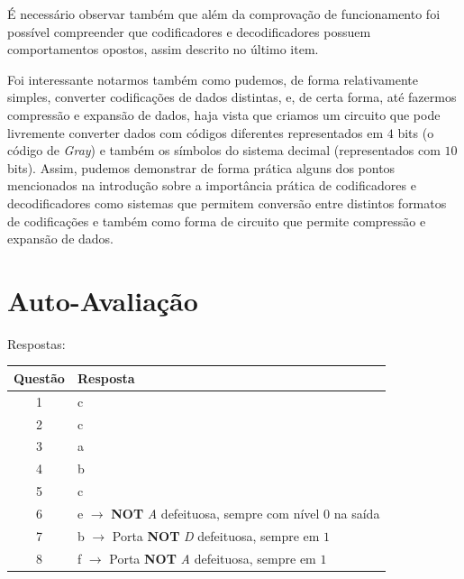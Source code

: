 \documentclass[12pt]{article}
\begin{document}
É necessário observar também que além da comprovação de funcionamento foi
possível compreender que codificadores e decodificadores possuem comportamentos
opostos, assim descrito no último item.

Foi interessante notarmos também como pudemos, de forma relativamente simples,
converter codificações de dados distintas, e, de certa forma, até fazermos
compressão e expansão de dados, haja vista que criamos um circuito que pode
livremente converter dados com códigos diferentes representados em $4$ bits (o
código de \emph{Gray}) e também os símbolos do sistema decimal (representados
com $10$ bits). Assim, pudemos demonstrar de forma prática alguns dos pontos
mencionados na introdução sobre a importância prática de codificadores e
decodificadores como sistemas que permitem conversão entre distintos formatos de
codificações e também como forma de circuito que permite compressão e expansão
de dados.


\nocite{*}



\newpage
\section*{Auto-Avaliação}

Respostas:

\begin{table}[H]
      \begin{tabular}{|c|l|} \hline
      \textbf{Questão} & \textbf{Resposta}\\
      \hline
      1 & c \\ \hline
      2 & c \\ \hline
      3 & a \\ \hline
      4 & b \\ \hline
      5 & c \\ \hline
      6 & e $\rightarrow$ \textbf{NOT} \emph{A} defeituosa, sempre com nível $0$ na saída \\ \hline
      7 & b $\rightarrow$ Porta \textbf{NOT} \emph{D} defeituosa, sempre em $1$ \\ \hline
      8 & f $\rightarrow$ Porta \textbf{NOT} \emph{A} defeituosa, sempre em $1$ \\ \hline
      \end{tabular}
\end{table}
\end{document}
